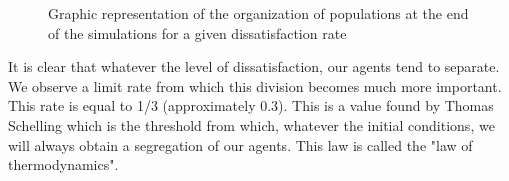 \documentclass[a4paper, 12pt]{report}
\begin{document}
\begin{figure}[!h]
	\centering
	\caption{Graphic representation of the organization of populations at the end of the simulations for a given dissatisfaction rate}
\end{figure}


It is clear that whatever the level of dissatisfaction, our agents tend to separate. We observe a limit rate from which this division becomes much more important.
This rate is equal to 1/3 (approximately 0.3). This is a value found by Thomas Schelling which is the threshold from which, whatever the initial conditions,
we will always obtain a segregation of our agents. This law is called the "law of thermodynamics".
\newpage
\end{document}
